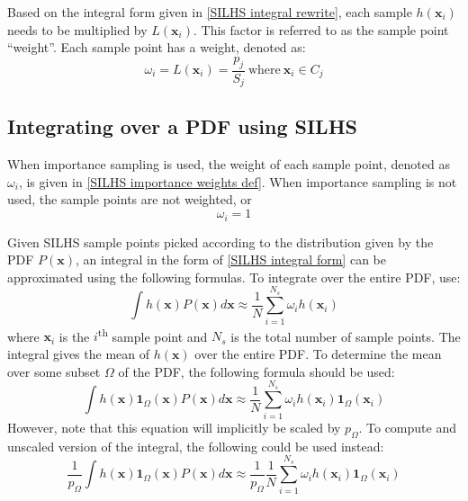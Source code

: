 \documentclass[11pt,fleqn]{article}
\begin{document}
Based on the integral form given in \eqref{SILHS integral rewrite}, each sample
$h(\mathbf{x}_i)$ needs to be multiplied by $L(\mathbf{x}_i)$. This factor is
referred to as the sample point ``weight''. Each sample point has a weight,
denoted as:
\begin{equation}
\omega_i = L(\mathbf{x}_i) = \frac{p_j}{S_j}\ \mathrm{where}\ \mathbf{x}_i\in
C_j \label{SILHS importance weights def}
\end{equation}

\subsection{Integrating over a PDF using SILHS}

When importance sampling is used, the weight of each sample point, denoted as
$\omega_i$, is given in \eqref{SILHS importance weights def}. When importance
sampling is not used, the sample points are not weighted, or
\begin{equation}
\omega_i = 1
\end{equation}

Given SILHS sample points picked according to the distribution given by the PDF
$P(\mathbf{x})$, an integral in the form of \eqref{SILHS integral form} can be
approximated using the following formulas. To integrate over the entire PDF,
use:
\begin{equation}
\int h(\mathbf{x}) P(\mathbf{x}) d\mathbf{x} \approx \frac{1}{N}
\sum_{i=1}^{N_s} \omega_i h(\mathbf{x}_i)
\end{equation}
where $\mathbf{x}_i$ is the $i$\textsuperscript{th} sample point and $N_s$ is
the total number of sample points. The integral gives the mean of
$h(\mathbf{x})$ over the entire PDF. To determine the mean over some subset
$\Omega$ of the PDF, the following formula should be used:
\begin{equation}
\int h(\mathbf{x})\mathbf{1}_\Omega(\mathbf{x}) P(\mathbf{x}) d\mathbf{x}
\approx \frac{1}{N}\sum_{i=1}^{N_s} \omega_i
h(\mathbf{x}_i) \mathbf{1}_\Omega(\mathbf{x}_i)
\end{equation}
However, note that this equation will implicitly be scaled by $p_\Omega$. To
compute and unscaled version of the integral, the following could be used
instead:
\begin{equation}
\frac{1}{p_\Omega}
\int h(\mathbf{x})\mathbf{1}_\Omega(\mathbf{x}) P(\mathbf{x}) d\mathbf{x}
\approx \frac{1}{p_\Omega}\frac{1}{N}\sum_{i=1}^{N_s} \omega_i
h(\mathbf{x}_i) \mathbf{1}_\Omega(\mathbf{x}_i)
\end{equation}
\end{document}
